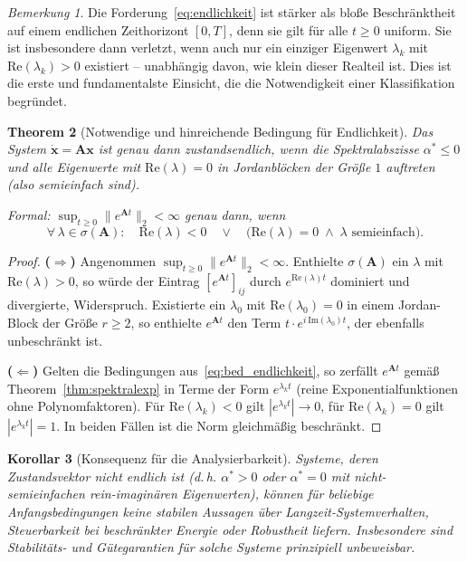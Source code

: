 ﻿\documentclass[12pt, a4paper, titlepage]{report}
\newtheorem{theorem}{Theorem}[section]
\newtheorem{corollary}[theorem]{Korollar}
\theoremstyle{definition}
\theoremstyle{remark}
\newtheorem{remark}[theorem]{Bemerkung}
\newcommand{\vx}{\bm{x}}
\newcommand{\vA}{\bm{A}}
\newcommand{\spec}{\sigma}
\newcommand{\re}{\mathrm{Re}}
\newcommand{\im}{\mathrm{Im}}
\begin{document}
\begin{remark}
Die Forderung~\eqref{eq:endlichkeit} ist stärker als bloße Beschränktheit auf einem
endlichen Zeithorizont $[0, T]$, denn sie gilt für alle $t \geq 0$ uniform. Sie ist
insbesondere dann verletzt, wenn auch nur ein einziger Eigenwert $\lambda_k$ mit
$\re(\lambda_k) > 0$ existiert -- unabhängig davon, wie klein dieser Realteil ist.
Dies ist die erste und fundamentalste Einsicht, die die Notwendigkeit einer
Klassifikation begründet.
\end{remark}

\begin{theorem}[Notwendige und hinreichende Bedingung für Endlichkeit]
\label{thm:endlichkeit}
Das System $\dot{\vx} = \vA\vx$ ist genau dann zustandsendlich, wenn die
Spektralabszisse $\alpha^* \leq 0$ und alle Eigenwerte mit $\re(\lambda) = 0$ in
Jordanblöcken der Größe $1$ auftreten (also semieinfach sind).

Formal: $\sup_{t \geq 0}\|e^{\vA t}\|_2 < \infty$ genau dann, wenn
\begin{equation}
  \forall\,\lambda \in \spec(\vA):\quad
  \re(\lambda) < 0 \quad\vee\quad
  \bigl(\re(\lambda) = 0 \;\wedge\; \text{$\lambda$ semieinfach}\bigr).
  \label{eq:bed_endlichkeit}
\end{equation}
\end{theorem}

\begin{proof}
\textbf{($\Rightarrow$)} Angenommen $\sup_{t\geq 0}\|e^{\vA t}\|_2 < \infty$.
Enthielte $\spec(\vA)$ ein $\lambda$ mit $\re(\lambda) > 0$, so würde der Eintrag
$[e^{\vA t}]_{ij}$ durch $e^{\re(\lambda)t}$ dominiert und divergierte, Widerspruch.
Existierte ein $\lambda_0$ mit $\re(\lambda_0) = 0$ in einem Jordan-Block der Größe
$r \geq 2$, so enthielte $e^{\vA t}$ den Term $t \cdot e^{i\,\im(\lambda_0)t}$, der
ebenfalls unbeschränkt ist.

\textbf{($\Leftarrow$)} Gelten die Bedingungen aus~\eqref{eq:bed_endlichkeit}, so
zerfällt $e^{\vA t}$ gemäß Theorem~\ref{thm:spektralexp} in Terme der Form
$e^{\lambda_k t}$ (reine Exponentialfunktionen ohne Polynomfaktoren). Für
$\re(\lambda_k) < 0$ gilt $|e^{\lambda_k t}| \to 0$, für $\re(\lambda_k) = 0$ gilt
$|e^{\lambda_k t}| = 1$. In beiden Fällen ist die Norm gleichmäßig beschränkt. \qedhere
\end{proof}

\begin{corollary}[Konsequenz für die Analysierbarkeit]
\label{cor:analysierbarkeit}
Systeme, deren Zustandsvektor nicht endlich ist (d.\,h. $\alpha^* > 0$ oder
$\alpha^* = 0$ mit nicht-semieinfachen rein-imaginären Eigenwerten), können für
beliebige Anfangsbedingungen keine stabilen Aussagen über Langzeit-Systemverhalten,
Steuerbarkeit bei beschränkter Energie oder Robustheit liefern. Insbesondere sind
Stabilitäts- und Gütegarantien für solche Systeme prinzipiell unbeweisbar.
\end{corollary}
\end{document}

